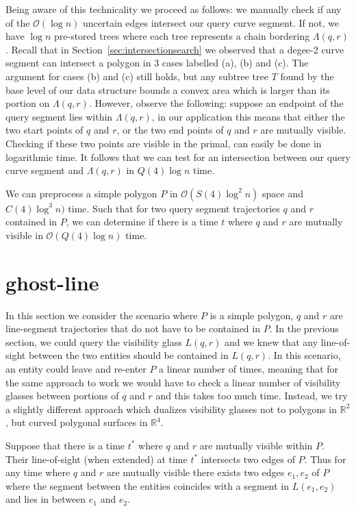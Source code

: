 \documentclass[a4paper, UKenglish]{lipics-v2018}
\begin{document}
%
Being aware of this technicality we proceed as follows: we manually check if any of the $\mathcal{O}(\log n)$ uncertain edges intersect our query curve segment. If not, we have $\log n$ pre-stored trees where each tree represents a chain bordering $\Lambda(q,r)$. Recall that in Section~\ref{sec:intersectionsearch} we observed that a degee-2 curve segment can intersect a polygon in 3 cases labelled (a), (b) and (c). The argument for cases (b) and (c) still holds, but any subtree tree $T$ found by the base level of our data structure bounds a convex area which is larger than its portion on $\Lambda(q,r)$. However, observe the following: suppose an endpoint of the query segment lies within $\Lambda(q,r)$, in our application this means that either the two start points of $q$ and $r$, or the two end points of $q$ and $r$ are mutually visible. Checking if these two points are visible in the primal, can easily be done in logarithmic time. It follows that we can test for an intersection between our query curve segment and $\Lambda(q,r)$ in $Q(4) \log n$ time.

\begin{theorem}
    We can preprocess a simple polygon $P$ in $\mathcal{O}(S(4)\log^2 n)$ space and $C(4) \log^3 n)$ time. Such that for two query segment trajectories $q$ and $r$ contained in $P$, we can determine if there is a time $t$ where $q$ and $r$ are mutually visible in $\mathcal{O}(Q(4) \log n)$ time.
\end{theorem}


\section{ghost-line}


In this section we consider the scenario where $P$ is a simple polygon, $q$ and $r$ are line-segment trajectories that do not have to be contained in $P$. In the previous section, we could query the visibility glass $L(q,r)$ and we knew that any line-of-sight between the two entities should be contained in $L(q,r)$. In this scenario, an entity could leave and re-enter $P$ a linear number of times, meaning that for the same approach to work we would have to check a linear number of visibility glasses between portions of $q$ and $r$ and this takes too much time. Instead, we try a slightly different approach which dualizes visibility glasses not to polygons in $\mathbb{R}^2$, but curved polygonal surfaces in $\mathbb{R}^4$.

Suppose that there is a time $t^*$ where $q$ and $r$ are mutually visible within $P$. Their line-of-sight (when extended) at time $t^*$ intersects two edges of $P$. Thus for any time where $q$ and $r$ are mutually visible there exists two edges $e_1, e_2$ of $P$ where  the segment between the entities coincides with a segment in $L(e_1, e_2)$ and lies in between $e_1$ and $e_2$. 
\end{document}
